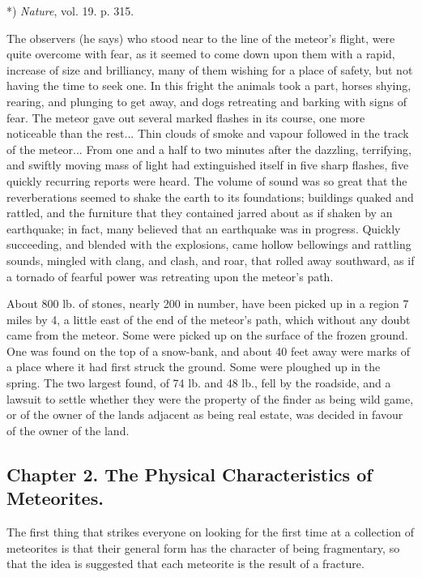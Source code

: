\documentclass[a4paper, 12pt, oneside, polutonikogreek, english]{article}
\begin{document}
*) \emph{Nature}, vol. 19. p. 315.

The observers (he says) who stood near to the line of the meteor's flight, were quite overcome with fear, as it seemed to come down upon them with a rapid, increase of size and brilliancy, many of them wishing for a place of safety, but not having the time to seek one. In this fright the animals took a part, horses shying, rearing, and plunging to get away, and dogs retreating and barking with signs of fear. The meteor gave out several marked flashes in its course, one more noticeable than the rest... Thin clouds of smoke and vapour followed in the track of the meteor... From one and a half to two minutes after the dazzling, terrifying, and swiftly moving mass of light had extinguished itself in five sharp flashes, five quickly recurring reports were heard. The volume of sound was so great that the reverberations seemed to shake the earth to its foundations; buildings quaked and rattled, and the furniture that they contained jarred about as if shaken by an earthquake; in fact, many believed that an earthquake was in progress. Quickly succeeding, and blended with the explosions, came hollow bellowings and rattling sounds, mingled with clang, and clash, and roar, that rolled away southward, as if a tornado of fearful power was retreating upon the meteor's path.

About 800 lb. of stones, nearly 200 in number, have been picked up in a region 7 miles by 4, a little east of the end of the meteor's path, which without any doubt came from the meteor. Some were picked up on the surface of the frozen ground. One was found on the top of a snow-bank, and about 40 feet away were marks of a place where it had first struck the ground. Some were ploughed up in the spring. The two largest found, of 74 lb. and 48 lb., fell by the roadside, and a lawsuit to settle whether they were the property of the finder as being wild game, or of the owner of the lands adjacent as being real estate, was decided in favour of the owner of the land.

\subsection{Chapter 2. The Physical Characteristics of Meteorites.}

The first thing that strikes everyone on looking for the first time at a collection of meteorites is that their general form has the character of being fragmentary, so that the idea is suggested that each meteorite is the result of a fracture.
\end{document}
